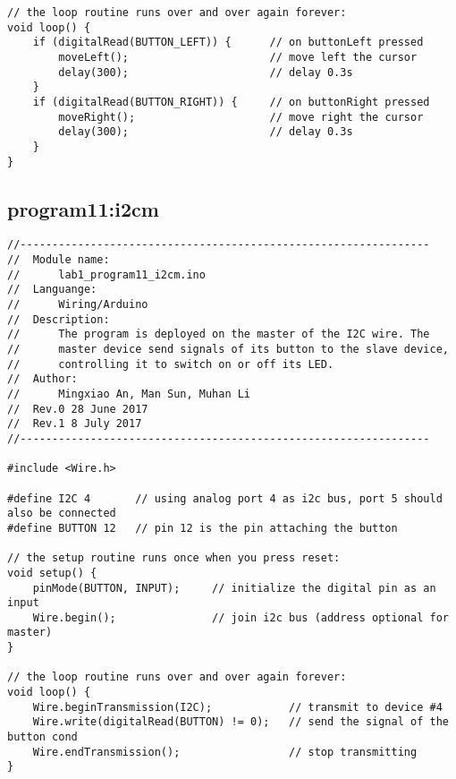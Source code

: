 \begin{verbatim}
// the loop routine runs over and over again forever:
void loop() {
    if (digitalRead(BUTTON_LEFT)) {      // on buttonLeft pressed
        moveLeft();                      // move left the cursor
        delay(300);                      // delay 0.3s
    }
    if (digitalRead(BUTTON_RIGHT)) {     // on buttonRight pressed
        moveRight();                     // move right the cursor
        delay(300);                      // delay 0.3s
    }
}
\end{verbatim}

\subsection{program11:i2cm}
\begin{verbatim}
//----------------------------------------------------------------
//  Module name:
//      lab1_program11_i2cm.ino
//  Languange:
//      Wiring/Arduino
//  Description:
//      The program is deployed on the master of the I2C wire. The
//      master device send signals of its button to the slave device,
//      controlling it to switch on or off its LED.
//  Author:
//      Mingxiao An, Man Sun, Muhan Li
//  Rev.0 28 June 2017
//  Rev.1 8 July 2017
//----------------------------------------------------------------

#include <Wire.h>

#define I2C 4       // using analog port 4 as i2c bus, port 5 should also be connected
#define BUTTON 12   // pin 12 is the pin attaching the button

// the setup routine runs once when you press reset:
void setup() {
    pinMode(BUTTON, INPUT);     // initialize the digital pin as an input
    Wire.begin();               // join i2c bus (address optional for master)
}

// the loop routine runs over and over again forever:
void loop() {
    Wire.beginTransmission(I2C);            // transmit to device #4
    Wire.write(digitalRead(BUTTON) != 0);   // send the signal of the button cond
    Wire.endTransmission();                 // stop transmitting
}
\end{verbatim}

